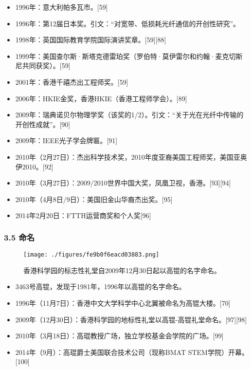 \begin{itemize}
\item 1996年：意大利帕多瓦市。[59]
\item 1996年：第12届日本奖。引文：“对宽带、低损耗光纤通信的开创性研究”。
\item 1998年：英国国际教育学院国际演讲奖章。[59][88]
\item 1999年：美国查尔斯·斯塔克德雷珀奖（罗伯特·莫伊雷尔和约翰·麦克切斯尼共同获奖）。[59]
\item 2001年：香港千禧杰出工程师奖。[59]
\item 2006年：HKIE金奖，香港HKIE（香港工程师学会）。[89]
\item 2009年：瑞典诺贝尔物理学奖（该奖的1/2）。引文：“关于光在光纤中传输的开创性成就”。[90]
\item 2009年：IEEE光子学会牌匾。[91]
\item 2010年（2月27日）：杰出科学技术奖，2010年度亚裔美国工程师奖，美国亚奥伊2010。[92]
\item 2010年（3月27日）：2009/2010世界中国大奖，凤凰卫视，香港。[93][94]
\item 2010年（4月8日/9日）：美国旧金山华裔杰出奖。[95]
\item 2014年2月20日：FTTH运营商奖和个人奖[96]
\end{itemize}

\subsubsection{3.5 命名}
\begin{figure}[ht]
\centering
\texttt{[image: ./figures/fe9b0f6eacd03883.png]}
\caption{香港科学园的标志性礼堂自2009年12月30日起以高锟的名字命名。} \label{fig_GK_4}
\end{figure}
\begin{itemize}
\item 3463号高锟，发现于1981年，1996年以高锟的名字命名。
\item 1996年（11月7日）：香港中文大学科学中心北翼被命名为高锟大楼。[70]
\item 2009年（12月30日）：香港科学园的地标性礼堂以高锟-高锟礼堂命名。[97][98]
\item 2010年（3月18日）：高琨教授广场，独立学校基金会学院的广场。[99]
\item 2014年（9月）：高琨爵士美国联合技术公司（现称BMAT STEM学院）开幕。[100]
\end{itemize}

